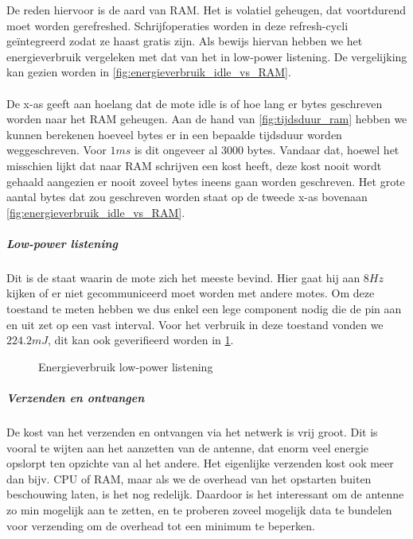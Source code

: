 \documentclass{article}
\begin{document}
De reden hiervoor is de aard van RAM. Het is volatiel geheugen, dat voortdurend
moet worden gerefreshed. Schrijfoperaties worden in deze refresh-cycli
ge\"integreerd zodat ze haast gratis zijn. Als bewijs hiervan hebben we het energieverbruik vergeleken met dat van het in low-power listening. 
De vergelijking kan gezien worden in \ref{fig:energieverbruik_idle_vs_RAM}.\\
\\
De x-as geeft aan hoelang dat de mote idle is of hoe lang er bytes geschreven worden naar het RAM geheugen. Aan de hand van \ref{fig:tijdsduur_ram} hebben we kunnen berekenen hoeveel bytes er in een bepaalde tijdsduur worden weggeschreven. Voor $1ms$ is dit ongeveer al 3000 bytes. Vandaar dat, hoewel het misschien lijkt dat naar RAM schrijven een kost heeft, deze kost nooit wordt gehaald aangezien er nooit zoveel bytes ineens gaan worden geschreven. Het grote aantal bytes dat zou geschreven worden staat op de tweede x-as bovenaan \ref{fig:energieverbruik_idle_vs_RAM}. 
\subparagraph{Low-power listening}
Dit is de staat waarin de mote zich het meeste bevind. Hier gaat hij aan $8Hz$ kijken of er niet gecommuniceerd moet worden met andere motes. Om deze toestand te meten hebben we dus enkel een lege component nodig die de pin aan en uit zet op een vast interval. Voor het verbruik in deze toestand vonden we $224.2mJ$, dit kan ook geverifieerd worden in \ref{fig:energieverbruik_lpl}.

\begin{figure}[h]
\centering

\caption{Energieverbruik low-power listening}
\label{fig:energieverbruik_lpl}
\end{figure}


\subparagraph{Verzenden en ontvangen}

De kost van het verzenden en ontvangen via het netwerk is vrij groot. Dit is
vooral te wijten aan het aanzetten van de antenne, dat enorm veel energie
opslorpt ten opzichte van al het andere. Het eigenlijke verzenden kost ook meer
dan bijv. CPU of RAM, maar als we de overhead van het opstarten buiten
beschouwing laten, is het nog redelijk. Daardoor is het interessant om de
antenne zo min mogelijk aan te zetten, en te proberen zoveel mogelijk data te
bundelen voor verzending om de overhead tot een minimum te beperken.
\end{document}
